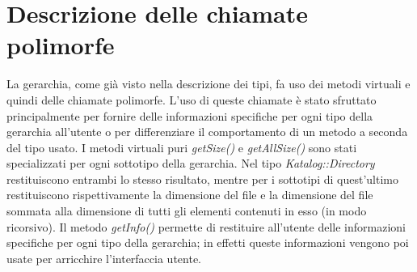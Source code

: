 \section{Descrizione delle chiamate polimorfe}

La gerarchia, come già visto nella descrizione dei tipi, fa uso dei metodi virtuali e quindi delle chiamate polimorfe. L'uso di queste chiamate è stato 
sfruttato principalmente per fornire delle informazioni specifiche per ogni tipo della gerarchia all'utente o per differenziare il comportamento di un metodo a seconda del tipo usato. 
I metodi virtuali puri \emph{getSize()} e \emph{getAllSize()} sono stati specializzati per ogni sottotipo della gerarchia. Nel tipo \emph{Katalog::Directory} 
restituiscono entrambi lo stesso risultato, mentre per i sottotipi di quest'ultimo restituiscono rispettivamente la dimensione del file e la dimensione del file sommata alla dimensione
di tutti gli elementi contenuti in esso (in modo ricorsivo). Il metodo \emph{getInfo()} permette di restituire all'utente delle informazioni specifiche per ogni tipo della gerarchia;
in effetti queste informazioni vengono poi usate per arricchire l'interfaccia utente.